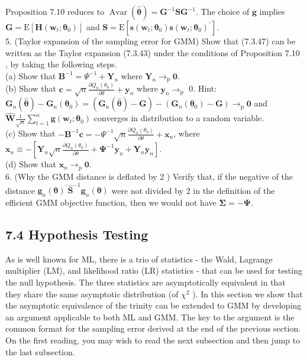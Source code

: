 \documentclass[10pt]{article}
\begin{document}
Proposition 7.10 reduces to $\operatorname{Avar}(\hat{\boldsymbol{\theta}})=\mathbf{G}^{-1} \mathbf{S G}^{-1}$. The choice of $\mathbf{g}$ implies $\mathbf{G}=\mathrm{E}\left[\mathbf{H}\left(\mathbf{w}_{t} ; \boldsymbol{\theta}_{0}\right)\right]$ and $\mathbf{S}=\mathrm{E}\left[\mathbf{s}\left(\mathbf{w}_{t} ; \boldsymbol{\theta}_{0}\right) \mathbf{s}\left(\mathbf{w}_{t} ; \boldsymbol{\theta}_{0}\right)^{\prime}\right]$.\\
5. (Taylor expansion of the sampling error for GMM) Show that (7.3.47) can be written as the Taylor expansion (7.3.43) under the conditions of Proposition 7.10 , by taking the following steps.\\
(a) Show that $\mathbf{B}^{-1}=\Psi^{-1}+\mathbf{Y}_{n}$ where $\mathbf{Y}_{n} \rightarrow_{\mathrm{p}} \mathbf{0}$.\\
(b) Show that $\mathbf{c}=\sqrt{n} \frac{\partial Q_{n}\left(\theta_{0}\right)}{\partial \theta}+\mathbf{y}_{n}$ where $\mathbf{y}_{n} \rightarrow_{\mathrm{p}}$ 0. Hint: $\mathbf{G}_{n}(\hat{\boldsymbol{\theta}})-\mathbf{G}_{n}\left(\boldsymbol{\theta}_{0}\right)= \left(\mathbf{G}_{n}(\hat{\boldsymbol{\theta}})-\mathbf{G}\right)-\left(\mathbf{G}_{n}\left(\boldsymbol{\theta}_{0}\right)-\mathbf{G}\right) \rightarrow_{\mathrm{p}} \mathbf{0}$ and $\widehat{\mathbf{W}} \frac{1}{\sqrt{n}} \sum_{t=1}^{n} \mathbf{g}\left(\mathbf{w}_{t} ; \boldsymbol{\theta}_{0}\right)$ converges in distribution to a random variable.\\
(c) Show that $-\mathbf{B}^{-1} \mathbf{c}=-\Psi^{-1} \sqrt{n} \frac{\partial Q_{n}\left(\theta_{0}\right)}{\partial \theta}+\mathbf{x}_{n}$, where $\mathbf{x}_{n} \equiv-\left[\mathbf{Y}_{n} \sqrt{n} \frac{\partial Q_{n}\left(\theta_{0}\right)}{\partial \theta}+\right. \left.\boldsymbol{\Psi}^{-1} \mathbf{y}_{n}+\mathbf{Y}_{n} \mathbf{y}_{n}\right]$.\\
(d) Show that $\mathbf{x}_{n} \rightarrow_{\mathrm{p}} \mathbf{0}$.\\
6. (Why the GMM distance is deflated by 2 ) Verify that, if the negative of the distance $\mathbf{g}_{n}(\boldsymbol{\theta})^{\prime} \widehat{\mathbf{S}}^{-1} \mathbf{g}_{n}(\boldsymbol{\theta})$ were not divided by 2 in the definition of the efficient GMM objective function, then we would not have $\boldsymbol{\Sigma}=-\boldsymbol{\Psi}$.

\subsection*{7.4 Hypothesis Testing}
As is well known for ML, there is a trio of statistics - the Wald, Lagrange multiplier (LM), and likelihood ratio (LR) statistics - that can be used for testing the null hypothesis. The three statistics are asymptotically equivalent in that they share the same asymptotic distribution (of $\chi^{2}$ ). In this section we show that the asymptotic equivalence of the trinity can be extended to GMM by developing an argument applicable to both ML and GMM. The key to the argument is the common format for the sampling error derived at the end of the previous section. On the first reading, you may wish to read the next subsection and then jump to the last subsection.
\end{document}
